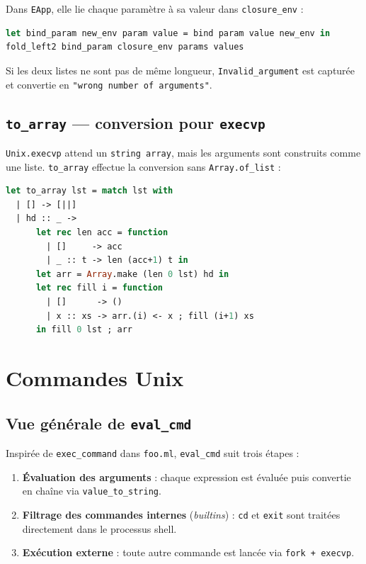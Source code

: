 \documentclass[11pt,a4paper]{article}
\begin{document}
Dans \texttt{EApp}, elle lie chaque paramètre à sa valeur dans
\texttt{closure\_env} :

\begin{lstlisting}[language=ml]
let bind_param new_env param value = bind param value new_env in
fold_left2 bind_param closure_env params values
\end{lstlisting}

Si les deux listes ne sont pas de même longueur,
\texttt{Invalid\_argument} est capturée et convertie en
\texttt{"wrong number of arguments"}.

\subsection{\texttt{to\_array} --- conversion pour \texttt{execvp}}

\texttt{Unix.execvp} attend un \texttt{string array}, mais les arguments
sont construits comme une liste. \texttt{to\_array} effectue la conversion
sans \texttt{Array.of\_list} :

\begin{lstlisting}[language=ml]
let to_array lst = match lst with
  | [] -> [||]
  | hd :: _ ->
      let rec len acc = function
        | []     -> acc
        | _ :: t -> len (acc+1) t in
      let arr = Array.make (len 0 lst) hd in
      let rec fill i = function
        | []      -> ()
        | x :: xs -> arr.(i) <- x ; fill (i+1) xs
      in fill 0 lst ; arr
\end{lstlisting}

\section{Commandes Unix}

\subsection{Vue générale de \texttt{eval\_cmd}}

Inspirée de \texttt{exec\_command} dans \texttt{foo.ml},
\texttt{eval\_cmd} suit trois étapes :

\begin{enumerate}
  \item \textbf{Évaluation des arguments} : chaque expression est évaluée
        puis convertie en chaîne via \texttt{value\_to\_string}.
  \item \textbf{Filtrage des commandes internes} (\textit{builtins}) :
        \texttt{cd} et \texttt{exit} sont traitées directement dans le processus shell.
  \item \textbf{Exécution externe} : toute autre commande est lancée via \texttt{fork + execvp}.
\end{enumerate}
\end{document}
